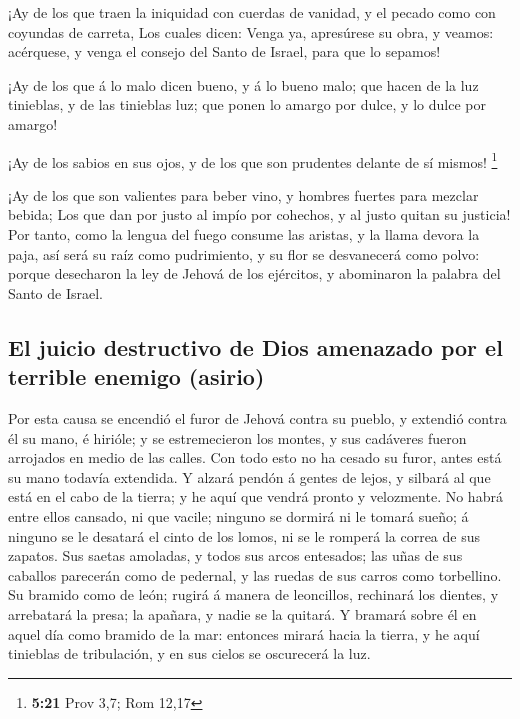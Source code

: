  ¡Ay de los que traen la iniquidad con cuerdas de
vanidad, y el pecado como con coyundas de carreta,  Los
cuales dicen: Venga ya, apresúrese su obra, y veamos: acérquese, y venga
el consejo del Santo de Israel, para que lo sepamos!

 ¡Ay de los que á lo malo dicen bueno, y á lo bueno malo;
que hacen de la luz tinieblas, y de las tinieblas luz; que ponen lo
amargo por dulce, y lo dulce por amargo!

 ¡Ay de los sabios en sus ojos, y de los que son
prudentes delante de sí mismos! \footnote{\textbf{5:21} Prov 3,7; Rom
  12,17}

 ¡Ay de los que son valientes para beber vino, y hombres
fuertes para mezclar bebida;  Los que dan por justo al
impío por cohechos, y al justo quitan su justicia!  Por
tanto, como la lengua del fuego consume las aristas, y la llama devora
la paja, así será su raíz como pudrimiento, y su flor se desvanecerá
como polvo: porque desecharon la ley de Jehová de los ejércitos, y
abominaron la palabra del Santo de Israel.

\hypertarget{el-juicio-destructivo-de-dios-amenazado-por-el-terrible-enemigo-asirio}{%
\subsection{El juicio destructivo de Dios amenazado por el terrible
enemigo
(asirio)}\label{el-juicio-destructivo-de-dios-amenazado-por-el-terrible-enemigo-asirio}}

 Por esta causa se encendió el furor de Jehová contra su
pueblo, y extendió contra él su mano, é hirióle; y se estremecieron los
montes, y sus cadáveres fueron arrojados en medio de las calles. Con
todo esto no ha cesado su furor, antes está su mano todavía extendida.
 Y alzará pendón á gentes de lejos, y silbará al que está
en el cabo de la tierra; y he aquí que vendrá pronto y velozmente.
 No habrá entre ellos cansado, ni que vacile; ninguno se
dormirá ni le tomará sueño; á ninguno se le desatará el cinto de los
lomos, ni se le romperá la correa de sus zapatos.  Sus
saetas amoladas, y todos sus arcos entesados; las uñas de sus caballos
parecerán como de pedernal, y las ruedas de sus carros como torbellino.
 Su bramido como de león; rugirá á manera de leoncillos,
rechinará los dientes, y arrebatará la presa; la apañara, y nadie se la
quitará.  Y bramará sobre él en aquel día como bramido de
la mar: entonces mirará hacia la tierra, y he aquí tinieblas de
tribulación, y en sus cielos se oscurecerá la luz.


